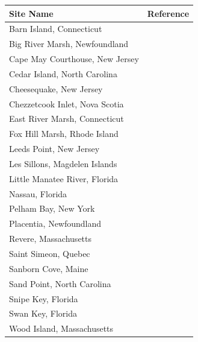 \begin{longtable}[]{@{}
  >{\raggedright\arraybackslash}p{}
  >{\raggedright\arraybackslash}p{}@{}}
\toprule\noalign{}
\begin{minipage}[b]{\linewidth}\raggedright
Site Name
\end{minipage} & \begin{minipage}[b]{\linewidth}\raggedright
Reference
\end{minipage} \\
\midrule\noalign{}
\endhead
\bottomrule\noalign{}
\endlastfoot
Barn Island, Connecticut & \citep{Donnelly2004, Gehrels2020} \\
Big River Marsh, Newfoundland & \citep{Kemp2018} \\
Cape May Courthouse, New Jersey & \citep{Kemp2013SealevelUSA, Cahill2016} \\
Cedar Island, North Carolina & \citep{Kemp2011, Kemp2017} \\
Cheesequake, New Jersey & \citep{Walker2021} \\
Chezzetcook Inlet, Nova Scotia & \citep{Gehrels2020} \\
East River Marsh, Connecticut & \citep{Kemp2015, Stearns2023} \\
Fox Hill Marsh, Rhode Island & \citep{Stearns2023} \\
Leeds Point, New Jersey & \citep{Kemp2013SealevelUSA, Cahill2016} \\
Les Sillons, Magdelen Islands & \citep{Barnett2017} \\
Little Manatee River, Florida & \citep{Gerlach2017} \\
Nassau, Florida & \citep{Kemp2014} \\
Pelham Bay, New York & \citep{Kemp2017, Stearns2023} \\
Placentia, Newfoundland & \citep{Kemp2018} \\
Revere, Massachusetts & \citep{Donnelly2006} \\
Saint Simeon, Quebec & \citep{Barnett2017} \\
Sanborn Cove, Maine & \citep{Gehrels2020} \\
Sand Point, North Carolina & \citep{Kemp2011, Kemp2017} \\
Snipe Key, Florida & \citep{Khan2022} \\
Swan Key, Florida & \citep{Khan2022} \\
Wood Island, Massachusetts & \citep{Kemp2011} \\
\end{longtable}

